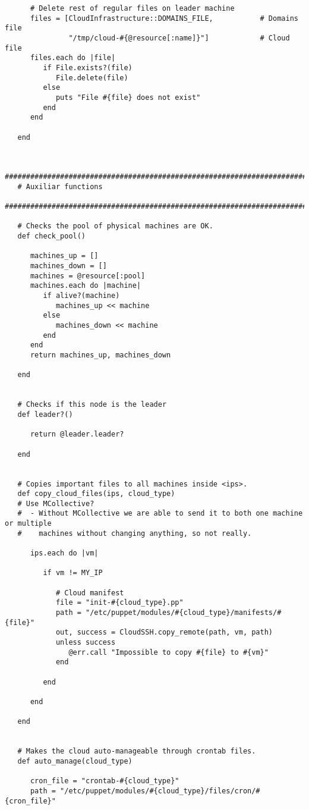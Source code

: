 \begin{lstlisting}
      # Delete rest of regular files on leader machine
      files = [CloudInfrastructure::DOMAINS_FILE,           # Domains file
               "/tmp/cloud-#{@resource[:name]}"]            # Cloud file
      files.each do |file|
         if File.exists?(file)
            File.delete(file)
         else
            puts "File #{file} does not exist"
         end
      end

   end


   #############################################################################
   # Auxiliar functions
   #############################################################################

   # Checks the pool of physical machines are OK.
   def check_pool()

      machines_up = []
      machines_down = []
      machines = @resource[:pool]
      machines.each do |machine|
         if alive?(machine)
            machines_up << machine
         else
            machines_down << machine
         end
      end
      return machines_up, machines_down
      
   end


   # Checks if this node is the leader
   def leader?()
    
      return @leader.leader?

   end


   # Copies important files to all machines inside <ips>.
   def copy_cloud_files(ips, cloud_type)
   # Use MCollective?
   #  - Without MCollective we are able to send it to both one machine or multiple
   #    machines without changing anything, so not really.

      ips.each do |vm|
      
         if vm != MY_IP
            
            # Cloud manifest
            file = "init-#{cloud_type}.pp"
            path = "/etc/puppet/modules/#{cloud_type}/manifests/#{file}"
            out, success = CloudSSH.copy_remote(path, vm, path)
            unless success
               @err.call "Impossible to copy #{file} to #{vm}"
            end

         end
         
      end
      
   end


   # Makes the cloud auto-manageable through crontab files.
   def auto_manage(cloud_type)

      cron_file = "crontab-#{cloud_type}"
      path = "/etc/puppet/modules/#{cloud_type}/files/cron/#{cron_file}"
      

\end{lstlisting}
